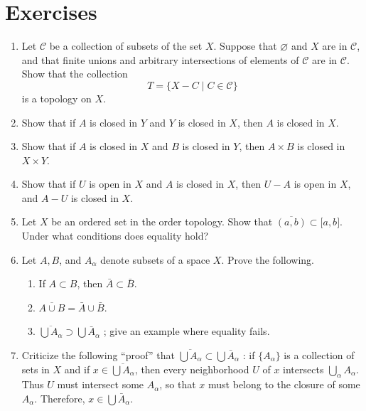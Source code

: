 \section*{Exercises}
\begin{enumerate}[itemsep=0.4em, parsep=0pt, topsep=0pt, partopsep=0pt, leftmargin=*, label=\arabic*., ref=\arabic*]
\item Let \(\mathcal{C}\) be a collection of subsets of the set \(X\). Suppose that \(\varnothing\) and \(X\) are in \(\mathcal{C}\), and that finite unions and arbitrary intersections of elements of \(\mathcal{C}\) are in \(\mathcal{C}\). Show that the collection \[ T = \{ X - C \mid C \in \mathcal{C}\} \] is a topology on \(X\).
\item Show that if \(A\) is closed in \(Y\) and \(Y\) is closed in \(X\), then \(A\) is closed in \(X\).
\item Show that if \(A\) is closed in \(X\) and \(B\) is closed in \(Y\), then \(A \times B\) is closed in \(X \times Y\).
\item Show that if \(U\) is open in \(X\) and \(A\) is closed in \(X\), then \(U - A\) is open in \(X\), and \(A - U\) is closed in \(X\).
\item Let \(X\) be an ordered set in the order topology. Show that \(\overline{( a,b) } \subset \lbrack a, b \rbrack\). Under what conditions does equality hold?
\item Let \(A,B\), and \(A_{\alpha }\) denote subsets of a space \(X\). Prove the following.
  \begin{enumerate}[itemsep=0.2em, parsep=0pt, topsep=0pt, partopsep=0pt, leftmargin=*, label=(\alph*), align=left]
  \item If \(A \subset B\), then \(\bar{A} \subset \bar{B}\).
  \item \(\overline{A \cup B} = \bar{A} \cup \bar{B}\).
  \item \(\overline{\bigcup {A}_{\alpha }} \supset \bigcup {\bar{A}}_{\alpha }\) ; give an example where equality fails.
  \end{enumerate}
\item Criticize the following ``proof'' that \(\overline{\bigcup {A}_{\alpha }} \subset \bigcup {\bar{A}}_{\alpha }\) : if \(\{ A_{\alpha }\}\) is a collection of sets in \(X\) and if \(x \in \overline{\bigcup {A}_{\alpha }}\), then every neighborhood \(U\) of \(x\) intersects \(\mathop{\bigcup }\limits_{\alpha }A_{\alpha }\). Thus \(U\) must intersect some \(A_{\alpha }\), so that \(x\) must belong to the closure of some \(A_{\alpha }\). Therefore, \(x \in \bigcup {\bar{A}}_{\alpha }\).

\end{enumerate}
